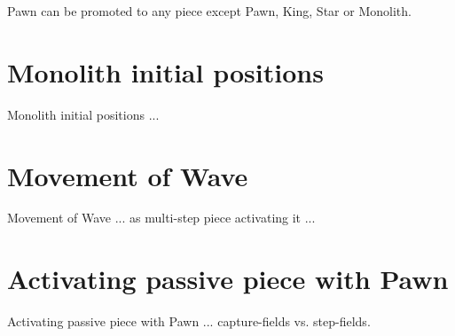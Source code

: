 Pawn can be promoted to any piece except Pawn, King, Star or Monolith.

\section*{Monolith initial positions}

Monolith initial positions ...

\section*{Movement of Wave}

Movement of Wave ... as multi-step piece activating it  ...

\section*{Activating passive piece with Pawn}

Activating passive piece with Pawn ... capture-fields vs. step-fields.


\clearpage %

